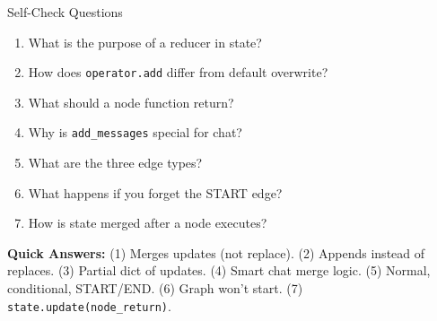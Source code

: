 \documentclass[aspectratio=169,11pt]{beamer}
\begin{document}
\begin{frame}[t,shrink=5]{Self-Check Questions}
\setlength{\itemsep}{0pt}
\vspace{0.05cm}

{\footnotesize
\begin{enumerate}
\setlength{\itemsep}{0.5pt}
  \item What is the purpose of a reducer in state?
  \item How does \texttt{operator.add} differ from default overwrite?
  \item What should a node function return?
  \item Why is \texttt{add\_messages} special for chat?
  \item What are the three edge types?
  \item What happens if you forget the START edge?
  \item How is state merged after a node executes?
\end{enumerate}

\vspace{0.05cm}

\textbf{Quick Answers:} (1) Merges updates (not replace). (2) Appends instead of replaces. (3) Partial dict of updates. (4) Smart chat merge logic. (5) Normal, conditional, START/END. (6) Graph won't start. (7) \texttt{state.update(node\_return)}.
}
\end{frame}
\end{document}
